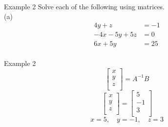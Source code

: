 \documentclass[t]{beamer}
\begin{document}
\begin{frame}{Example 2}
Solve each of the following using matrices.	\newline\\
(a) \quad 
\begin{align*}
4y	+ z &= -1 \\
-4x - 5y + 5z &= 0 \\
6x + 5y &= 25 \\
\end{align*}
\end{frame}

\begin{frame}{Example 2}
\[
\begin{bmatrix}
x \\ y \\ z \\
\end{bmatrix}
= A^{-1}B
\]
\pause \vspace{6pt}
\[
\begin{bmatrix}
x \\ y \\ z \\
\end{bmatrix}
= \begin{bmatrix}
5 \\ -1 \\ 3 \\
\end{bmatrix}
\]
\pause \vspace{6pt}
\[x = 5, \quad y = -1, \quad z = 3\]
\end{frame}
\end{document}
